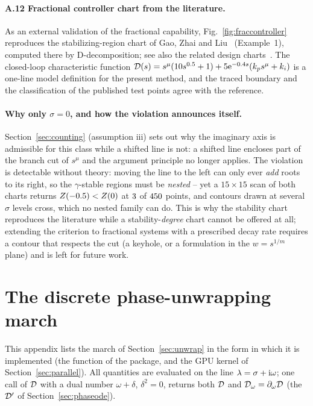 \paragraph{A.12 Fractional controller chart from the literature.}
As an external validation of the fractional capability,
Fig.~\ref{fig:fraccontroller} reproduces the stabilizing-region chart of
Gao, Zhai and Liu~\cite{gao2017robust} (Example~1), computed there by
D-decomposition; see also the related design
charts~\cite{hamamci2007algorithm,hohenbichler2008comments,ruszewski2008stability,cheng2006stabilization}.
The closed-loop characteristic function
$\mathcal{D}(s)=s^{\mu}(10s^{0.5}+1)+5\mathrm{e}^{-0.4s}(k_p s^{\mu}+k_i)$ is a
one-line model definition for the present method, and the traced boundary and
the classification of the published test points agree with the reference.

\paragraph{Why only $\sigma=0$, and how the violation announces itself.}
Section~\ref{sec:counting} (assumption iii) sets out why the imaginary axis is admissible for
this class while a shifted line is not: a shifted line encloses part of the
branch cut of $s^{\mu}$ and the argument principle no longer applies. The
violation is detectable without theory: moving the line to the left can only
ever \emph{add} roots to its right, so the $\gamma$-stable regions must be
\emph{nested} -- yet a $15\times15$ scan of both charts returns
$Z(-0.5)<Z(0)$ at $3$ of $450$ points, and contours
drawn at several $\sigma$ levels cross, which no nested family can do. This
is why the stability chart reproduces the literature while a
stability-\emph{degree} chart cannot be offered at all; extending the
criterion to fractional systems with a prescribed decay rate requires a
contour that respects the cut (a keyhole, or a formulation in the
$w=s^{1/m}$ plane) and is left for future work.
\section{The discrete phase-unwrapping march}\label{app:unwrap}

This appendix lists the march of Section~\ref{sec:unwrap} in the form in which
it is implemented (the function
 of the package,
and the GPU kernel of Section~\ref{sec:parallel}). All quantities are
evaluated on the line $\lambda=\sigma+\mathrm{i}\omega$; one call of $\mathcal{D}$ with a dual
number $\omega+\delta$, $\delta^2=0$, returns both $\mathcal{D}$ and
$\mathcal{D}_\omega=\partial_\omega\mathcal{D}$ (the $\mathcal{D}'$ of Section~\ref{sec:phaseode}).

